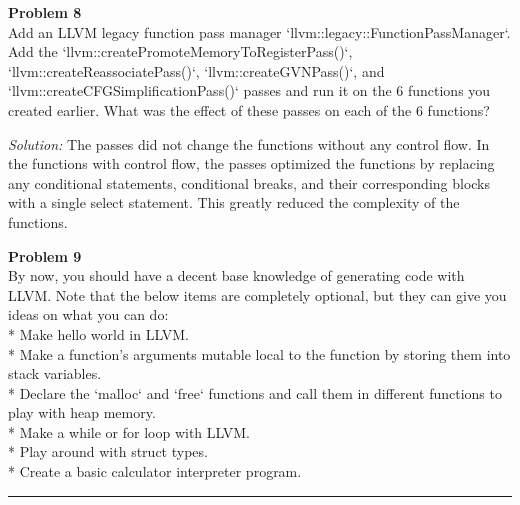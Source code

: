 \documentclass[a4paper, 11pt]{article}
\newenvironment{problem}[2][Problem]
    { \begin{mdframed}[backgroundcolor=gray!20] \textbf{#1 #2} \\}
    {  \end{mdframed}}
\newenvironment{solution}
    {\textit{Solution:}}
    {}
\begin{document}
\begin{problem}{8}
Add an LLVM legacy function pass manager `llvm::legacy::FunctionPassManager`. Add the `llvm::createPromoteMemoryToRegisterPass()`, `llvm::createReassociatePass()`, `llvm::createGVNPass()`, and `llvm::createCFGSimplificationPass()` passes and run it on the 6 functions you created earlier. What was the effect of these passes on each of the 6 functions?

\end{problem}

\begin{solution}
The passes did not change the functions without any control flow. In the functions with control flow, the passes optimized the functions by replacing any conditional statements, conditional breaks, and their corresponding blocks with a single select statement. This greatly reduced the complexity of the functions.
\end{solution}

\begin{problem}{9}
By now, you should have a decent base knowledge of generating code with LLVM. Note that the below items are completely optional, but they can give you ideas on what you can do: \\
* Make hello world in LLVM. \\
* Make a function's arguments mutable local to the function by storing them into stack variables. \\
* Declare the `malloc` and `free` functions and call them in different functions to play with heap memory. \\
* Make a while or for loop with LLVM. \\
* Play around with struct types. \\
* Create a basic calculator interpreter program. \\

\end{problem}

%
\noindent\rule{7in}{2.8pt}
\end{document}
